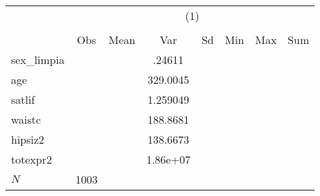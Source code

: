 {
\def\sym#1{\ifmmode^{#1}\else\(^{#1}\)\fi}
\begin{tabular}{l*{1}{ccccccc}}
\hline\hline
            &\multicolumn{7}{c}{(1)}                                                                   \\
            &\multicolumn{7}{c}{}                                                                      \\
            &         Obs&        Mean&         Var&          Sd&         Min&         Max&         Sum\\
\hline
sex\_limpia  &            &            &      .24611&            &            &            &            \\
age         &            &            &    329.0045&            &            &            &            \\
satlif      &            &            &    1.259049&            &            &            &            \\
waistc      &            &            &    188.8681&            &            &            &            \\
hipsiz2     &            &            &    138.6673&            &            &            &            \\
totexpr2    &            &            &    1.86e+07&            &            &            &            \\
\hline
\(N\)       &        1003&            &            &            &            &            &            \\
\hline\hline
\end{tabular}
}
